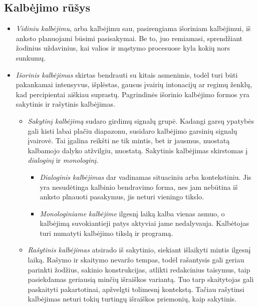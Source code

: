 \subsection{Kalbėjimo rūšys}

\begin{itemize}
  \item \emph{Vidiniu kalbėjimu}, arba kalbėjimu sau, pasirengiama išoriniam
  kalbėjimui, iš anksto planuojami būsimi pasisakymai. Be to, juo remiamasi,
  sprendžiant žodinius uždavinius, kai valios ir mąstymo procesuose kyla 
  kokių nors sunkumų.
  \item \emph{Išorinis kalbėjimas} skirtas bendrauti su kitais asmenimis,
  todėl turi būti pakankamai intensyvus, išplėstas, gausus įvairių
  intonacijų ar regimų ženklų, kad percipientai aiškiau suprastų.
  Pagrindinės išorinio kalbėjimo formos yra sakytinis ir rašytinis 
  kalbėjimas.
  \begin{itemize}
    \item \emph{Sakytinį kalbėjimą} sudaro girdimų signalų grupė. Kadangi
    garsų ypatybės gali kisti labai plačiu diapazonu, susidaro kalbėjimo
    garsinių signalų įvairovė. Tai įgalina reikšti ne tik mintis, bet ir
    jausmus, nuostatą kalbamojo dalyko atžvilgiu, nuostatą. Sakytinis 
    kalbėjimas skirstomas į \emph{dialoginį} ir \emph{monologinį}.
    \begin{itemize}
      \item \emph{Dialoginis kalbėjimas} dar vadinamas situaciniu arba 
      kontekstiniu. Jis yra nesudėtinga kalbinio bendravimo forma, nes jam
      nebūtina iš anksto plnauoti pasakymus, jis neturi vieningo tikslo.
      \item \emph{Monologiniame kalbėjime} ilgesnį laiką kalba vienas asmuo,
      o kalbėjimą suvokiantieji patys aktyviai jame nedalyvauja. Kalbėtojas 
      turi numatyti kalbėjimo tikslą ir programą. 
    \end{itemize}
    \item \emph{Rašytinis kalbėjimas} atsirado iš sakytinio, siekiant 
    išlaikyti mintis ilgesnį laiką. Rašymo ir skaitymo nevaržo tempas, todėl
    rašantysis gali geriau parinkti žodžius, sakinio konstrukcijas, atlikti 
    redakcinius taisymus, taip pasiekdamas geriausią minčių išraiškos variantą.
    Tuo tarp skaitytojas gali paskaityti pakartotinai, apžvelgti tolimesnį 
    kontekstą. Tačiau rašytinsi kalbėjimas neturi tokių turtingų išraiškos 
    priemonių, kaip sakytinis.
  \end{itemize}
\end{itemize}

